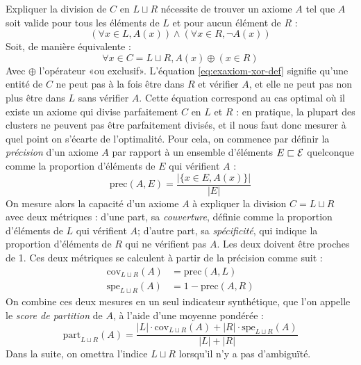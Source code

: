 Expliquer la division de $C$ en $L \sqcup R$ nécessite de trouver un axiome $A$ tel que $A$ soit valide pour tous les éléments de $L$ et pour aucun élément de $R$ :
\begin{equation}
    \left(\forall x \in L, A(x)  \right) \land \left(\forall x \in R, \neg A(x) \right)
\end{equation}
Soit, de manière équivalente :
\begin{equation}
    \forall x \in C = L \sqcup R, A(x) \oplus (x \in R)
    \label{eq:exaxiom-xor-def}
\end{equation}
Avec $\oplus$ l'opérateur «ou exclusif». L'équation \ref{eq:exaxiom-xor-def} signifie qu'une entité de $C$ ne peut pas à la fois être dans $R$ et vérifier $A$, et elle ne peut pas non plus être dans $L$ sans vérifier $A$. Cette équation correspond au cas optimal où il existe un axiome qui divise parfaitement $C$ en $L$ et $R$ : en pratique, la plupart des clusters ne peuvent pas être parfaitement divisés, et il nous faut donc mesurer à quel point on s'écarte de l'optimalité. Pour cela, on commence par définir la \textit{précision} d'un axiome $A$ par rapport à un ensemble d'éléments $E \sqsubset \mathcal{E}$ quelconque comme la proportion d'éléments de $E$ qui vérifient $A$ :
\begin{equation}
    \text{prec}(A, E) = \frac{|\{ x \in E, A(x)\}|}{| E |}
\end{equation}
On mesure alors la capacité d'un axiome $A$ à expliquer la division $C = L \sqcup R$ avec deux métriques : d'une part, sa \textit{couverture}, définie comme la proportion d'éléments de $L$ qui vérifient $A$; d'autre part, sa \textit{spécificité}, qui indique la proportion d'éléments de $R$ qui ne vérifient pas $A$. Les deux doivent être proches de 1. Ces deux métriques se calculent à partir de la précision comme suit :
\begin{align}
    \text{cov}_{L \sqcup R}(A) &= \text{prec}(A, L) \\
    \text{spe}_{L \sqcup R}(A) &= 1 - \text{prec}(A, R)
\end{align}
On combine ces deux mesures en un seul indicateur synthétique, que l'on appelle le \textit{score de partition} de $A$, à l'aide d'une moyenne pondérée :
\begin{equation}
    \text{part}_{L \sqcup R}(A) = \frac{|L| \cdot \text{cov}_{L \sqcup R}(A) + |R| \cdot \text{spe}_{L \sqcup R}(A)}{|L| + |R|}
\end{equation}
Dans la suite, on omettra l'indice $L \sqcup R$ lorsqu'il n'y a pas d'ambiguïté.

